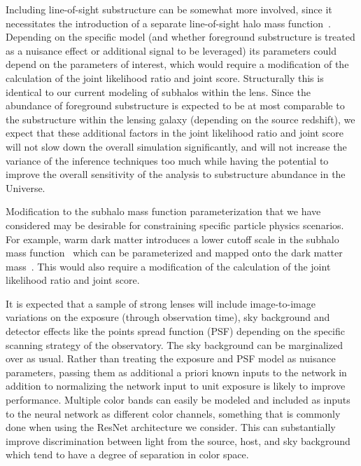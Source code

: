 \documentclass[twocolumn]{aastex62}
\begin{document}
Including line-of-sight substructure can be somewhat more involved, since it necessitates the introduction of a separate line-of-sight halo mass function~\citep{1610.01599,1710.05029,1901.11031,2019arXiv190504182H}. Depending on the specific model (and whether foreground substructure is treated as a nuisance effect or additional signal to be leveraged) its parameters could depend on the parameters of interest, which would require a modification of the calculation of the joint likelihood ratio and joint score. Structurally this is identical to our current modeling of subhalos within the lens. Since the abundance of foreground substructure is expected to be at most comparable to the substructure within the lensing galaxy (depending on the source redshift), we expect that these additional factors in the joint likelihood ratio and joint score will not slow down the overall simulation significantly, and will not increase the variance of the inference techniques too much while having the potential to improve the overall sensitivity of the analysis to substructure abundance in the Universe. 

Modification to the subhalo mass function parameterization that we have considered may be desirable for constraining specific particle physics scenarios. For example, warm dark matter introduces a lower cutoff scale in the subhalo mass function~\citep{2001ApJ...556...93B} which can be parameterized and mapped onto the dark matter mass~\citep{1308.1399,1112.0330,1702.00009,1512.06507}. This would also require a modification of the calculation of the joint likelihood ratio and joint score.

It is expected that a sample of strong lenses will include image-to-image variations on the exposure (through observation time), sky background and detector effects like the points spread function (PSF) depending on the specific scanning strategy of the observatory. The sky background can be marginalized over as usual. Rather than treating the exposure and PSF model as nuisance parameters, passing them as additional a priori known inputs to the network in addition to normalizing the network input to unit exposure is likely to improve performance. Multiple color bands can easily be modeled and included as inputs to the neural network as different color channels, something that is commonly done when using the ResNet architecture we consider. This can substantially improve discrimination between light from the source, host, and sky background which tend to have a degree of separation in color space.
\end{document}
